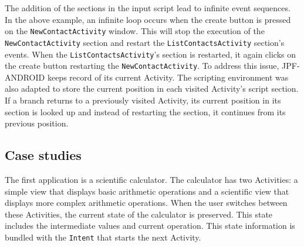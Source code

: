 \documentclass{acm_proc_article-sp}
\begin{document}
The addition of the sections in the input script lead to infinite event sequences. In the above example, an infinite loop occurs when the
create button is pressed on the \texttt{NewContactActivity} window. This will stop the execution of the \texttt{NewContactActivity} section and restart
the \texttt{ListContactsActivity} section's events. When the \texttt{ListContactsActivity}'s section is restarted, it again clicks on the create button
restarting the \texttt{NewContactActivity}. To address this issue, JPF-ANDROID keeps record of its current Activity. The scripting environment was
also adapted to store the current position in each visited Activity's script section. If a branch returns to a previously visited
Activity, its current position in its section is looked up and instead of restarting the section, it continues from its previous position.

\subsection{Case studies}
The first application is a scientific calculator. The calculator has two Activities: a simple view that
displays basic arithmetic operations and a scientific view that displays more complex arithmetic operations. When the user switches
between these Activities, the current state of the calculator is preserved. This state includes the intermediate values and current
operation. This state information is bundled with the \texttt{Intent} that starts the next Activity.
\end{document}
